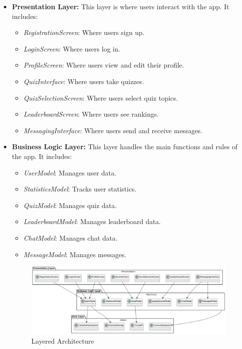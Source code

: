 \begin{itemize}
    \item \textbf{Presentation Layer:} This layer is where users interact with the app. It includes:
    \begin{itemize}
        \item \textit{RegistrationScreen}: Where users sign up.
        \item \textit{LoginScreen}: Where users log in.
        \item \textit{ProfileScreen}: Where users view and edit their profile.
        \item \textit{QuizInterface}: Where users take quizzes.
        \item \textit{QuizSelectionScreen}: Where users select quiz topics.
        \item \textit{LeaderboardScreen}: Where users see rankings.
        \item \textit{MessagingInterface}: Where users send and receive messages.
    \end{itemize}

         \item \textbf{Business Logic Layer:} This layer handles the main functions and rules of the app. It includes:
        \begin{itemize}
            \item \textit{UserModel}: Manages user data.
            \item \textit{StatisticsModel}: Tracks user statistics.
            \item \textit{QuizModel}: Manages quiz data.
            \item \textit{LeaderboardModel}: Manages leaderboard data.
            \item \textit{ChatModel}: Manages chat data.
            \item \textit{MessageModel}: Manages messages.
        \end{itemize}

\begin{figure}[H]
    \centering
    \includegraphics[width=1.1\linewidth, height=0.4\textheight]{Images/Components Architecture.png}
    \caption{Layered Architecture}
\end{figure}



\end{itemize}

